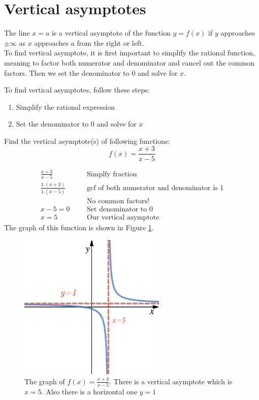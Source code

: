 \section{Vertical asymptotes}
The line $x = a$ is a vertical asymptote of the function $y = f(x)$ if $y$ approaches $\pm \infty$ as $x$ approaches $a$ from the right or left.\\
To find vertical asymptote, it is first important to simplify the rational function, meaning to factor both numerator and denominator and cancel out the common factors. Then we set the denominator to 0 and solve for $x$.
\begin{tcolorbox}[title= Vertical asymptote, fonttitle=\bfseries]
To find vertical asymptotes, follow these steps:
\begin{enumerate}[1.]
    \item Simplify the rational expression
    \item Set the denominator to 0 and solve for $x$
\end{enumerate}
\end{tcolorbox}
\begin{exa}
        Find the vertical asymptote(s) of following functions:
        \begin{equation*}
            f(x) = \frac{x+3}{x-5}
        \end{equation*}
\end{exa}
\begin{align*}
    \frac{x+3}{x-5}&     &   &\text{Simplfy fraction}\\
    \frac{1.(x+3)}{1.(x-5)}&    &   &\text{gcf of both numerator and denominator is $1$}\\
    &   &   &\text{No common factors! }\\
    x-5=0&    &   &\text{Set denominator to 0}\\
    x = 5&   &      &\text{Our vertical asymptote}
\end{align*}
The graph of this function is shown in Figure \ref{fig:ex_1}.
\begin{figure}[ht]
    \centering
    \includegraphics[width=7cm]{pics/ex1.png}
    \caption{The graph of $f(x)=\frac{x+3}{x-5}$. There is a vertical asymptote which is $x=5$. Also there is a horizontal one $y=1$}
    \label{fig:ex_1}
\end{figure}
